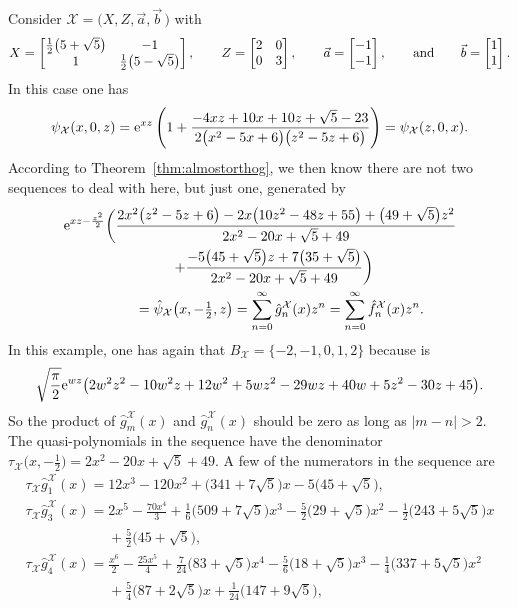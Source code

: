 \documentclass[10pt,a4paper]{amsart}
\numberwithin{equation}{section}
\theoremstyle{definition}
\def\X{\mathcal{X}}
\def\ff{\hat f}
\def\gg{\hat g}
\begin{document}
Consider $\X=\bigl(X,Z,\vec a,\vec b\,\bigr)$ with
\[
X=\left[\begin{matrix}
\frac{1}{2}
 \bigl(5+\sqrt{5}\bigr) & -1
 \\
 1 & \frac{1}{2}
 \bigl(5-\sqrt{5}\bigr) \end{matrix}\right],\qquad
Z=\left[\begin{matrix}
 2 & 0 \\
 0 & 3 \end{matrix}\right],\qquad
\vec a=\left[\begin{matrix}
 -1 \\
 -1 \end{matrix}\right],\qquad \hbox{and}\qquad
\vec b=\left[\begin{matrix}
1 \\
 1 \end{matrix}\right].
\]
In this case one has
\[
\psi_{\X}(x,0,z)={\rm e}^{x z} \left(1+\frac{-4 x z+10
 x+10 z+\sqrt{5}-23}{2
 \bigl(x^2-5 x+6\bigr)
 \bigl(z^2-5
 z+6\bigr)}\right)
=\psi_{\X}(z,0,x).
\]
According to Theorem~\ref{thm:almostorthog}, we then know there are
not two sequences to deal with here, but just one, generated by
\begin{gather*}
{\rm e}^{x z-\frac{z^2}{2}}\bigg(
 \frac{
2 x^2 \bigl(z^2-5 z+6\bigr)-2 x \bigl(10 z^2-48 z+55\bigr)+\bigl(49+\sqrt{5}\bigr)
 z^2
 }{2 x^2-20 x+\sqrt{5}+49}\\
 \qquad+\frac{
-5 \bigl(45+\sqrt{5}\bigr) z+7 \bigl(35+\sqrt{5}\bigr)
 }{2 x^2-20 x+\sqrt{5}+49}\bigg)
 \\
 \phantom{\qquad+}{}=\hat\psi_{\X}\bigl(x,-\tfrac{1}{2},z\bigr)
 =\sum_{n=0}^{\infty}\gg_n^{\X}(x)z^n=\sum_{n=0}^{\infty}\ff_n^{\X}(x)z^n.
\end{gather*}
 In this example, one has again that $B_{\X}=\{-2,-1,0,1,2\}$ because
\smash{$ \hat{\hat\psi}_{\X}(w,0,z)$} is
 \[
\sqrt{\frac{\pi }{2}} {\rm e}^{w z}
 \bigl(2 w^2 z^2-10 w^2 z+12
 w^2+5 w z^2-29 w z+40 w+5
 z^2-30 z+45\bigr).
 \]
 So
 the product of $\gg_m^{\X}(x)$ and $\gg_n^{\X}(x)$ should be
 zero as long as $|m-n|>2$. The quasi-polynomials in the sequence have the denominator
$ \tau_{\X}\bigl(x,-\tfrac{1}{2}\bigr)=2 x^2-20 x+\sqrt{5}+49$. A few of the numerators
in the sequence are
\begin{gather*}
\tau_{\X} \gg_1^{\X}(x)=12 x^3-120 x^2+\bigl(341+7
 \sqrt{5}\bigr) x-5
 \bigl(45+\sqrt{5}\bigr),\\
 \tau_{\X}\gg_3^{\X}(x)=2 x^5-\frac{70 x^4}{3}+\frac{1}{6}
 \bigl(509+7 \sqrt{5}\bigr)
 x^3-\frac{5}{2}
 \bigl(29+\sqrt{5}\bigr)
 x^2-\frac{1}{2} \bigl(243+5
 \sqrt{5}\bigr) x\\
 \phantom{ \tau_{\X}\gg_3^{\X}(x)=}{}+\frac{5}{2}
 \bigl(45+\sqrt{5}\bigr),
\\
\tau_{\X} \gg_4^{\X}(x)=\frac{x^6}{2}-\frac{25
 x^5}{4}+\frac{7}{24}
 \bigl(83+\sqrt{5}\bigr)
 x^4-\frac{5}{6}
 \bigl(18+\sqrt{5}\bigr)
 x^3-\frac{1}{4} \bigl(337+5
 \sqrt{5}\bigr) x^2\\
 \phantom{\tau_{\X} \gg_4^{\X}(x)=}{}+\frac{5}{4}
 \bigl(87+2 \sqrt{5}\bigr)
 x+\frac{1}{24} \bigl(147+9
 \sqrt{5}\bigr),
\end{gather*}
\end{document}
